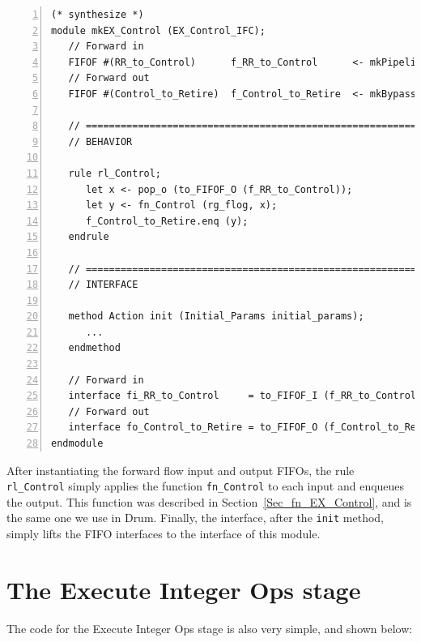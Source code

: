 {\small
\begin{Verbatim}[frame=single, numbers=left, label=(In file:src\_Fife/S4\_EX\_Control.bsv)]
(* synthesize *)
module mkEX_Control (EX_Control_IFC);
   // Forward in
   FIFOF #(RR_to_Control)      f_RR_to_Control      <- mkPipelineFIFOF;
   // Forward out
   FIFOF #(Control_to_Retire)  f_Control_to_Retire  <- mkBypassFIFOF;

   // ================================================================
   // BEHAVIOR

   rule rl_Control;
      let x <- pop_o (to_FIFOF_O (f_RR_to_Control));
      let y <- fn_Control (rg_flog, x);
      f_Control_to_Retire.enq (y);
   endrule

   // ================================================================
   // INTERFACE

   method Action init (Initial_Params initial_params);
      ...
   endmethod

   // Forward in
   interface fi_RR_to_Control     = to_FIFOF_I (f_RR_to_Control);
   // Forward out
   interface fo_Control_to_Retire = to_FIFOF_O (f_Control_to_Retire);
endmodule
\end{Verbatim}
}

After instantiating the forward flow input and output FIFOs, the rule
\verb|rl_Control| simply applies the function \verb|fn_Control| to
each input and enqueues the output.  This function was described in
Section~\ref{Sec_fn_EX_Control}, and is the same one we use in
Drum.  Finally, the interface, after the \verb|init| method, simply
lifts the FIFO interfaces to the interface of this module.


\section{The Execute Integer Ops stage}

\label{Sec_Fife_IALU_stage}

The code for the Execute Integer Ops stage is also very simple, and
shown below:

